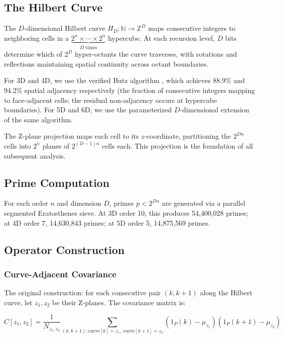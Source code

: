\documentclass[11pt,a4paper]{article}
\begin{document}
\subsection{The Hilbert Curve}

The $D$-dimensional Hilbert curve $H_D: \mathbb{N} \to \mathbb{Z}^D$ maps
consecutive integers to neighboring cells in a
$\underbrace{2^n \times \cdots \times 2^n}_{D \text{ times}}$ hypercube.
At each recursion level, $D$ bits determine which of $2^D$ hyper-octants
the curve traverses, with rotations and reflections maintaining spatial
continuity across octant boundaries.

For 3D and 4D, we use the verified Butz algorithm \cite{butz1971,
hamilton2006}, which achieves 88.9\% and 94.2\% spatial adjacency
respectively (the fraction of consecutive integers mapping to face-adjacent
cells; the residual non-adjacency occurs at hypercube boundaries). For 5D
and 6D, we use the parameterized $D$-dimensional extension of the same
algorithm.

The Z-plane projection maps each cell to its $z$-coordinate, partitioning
the $2^{Dn}$ cells into $2^n$ planes of $2^{(D-1)n}$ cells each. This
projection is the foundation of all subsequent analysis.

\subsection{Prime Computation}

For each order $n$ and dimension $D$, primes $p < 2^{Dn}$ are generated via
a parallel segmented Eratosthenes sieve. At 3D order 10, this produces
54,400,028 primes; at 4D order 7, 14,630,843 primes; at 5D order 5,
14,875,569 primes.

\subsection{Operator Construction}

\subsubsection{Curve-Adjacent Covariance}

The original construction: for each consecutive pair $(k, k+1)$ along the
Hilbert curve, let $z_1, z_2$ be their Z-planes. The covariance matrix is:

\begin{equation}
C[z_1, z_2] = \frac{1}{N_{z_1,z_2}} \sum_{(k,k+1): \text{curve}[k]=z_1,\;
\text{curve}[k+1]=z_2} (1_P(k) - \mu_{z_1})(1_P(k+1) - \mu_{z_2})
\end{equation}
\end{document}
